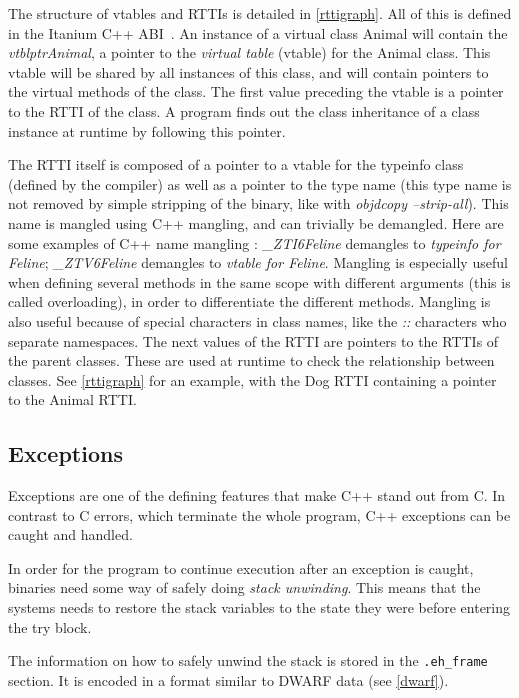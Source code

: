 \documentclass[a4paper,11pt,oneside]{report}
\begin{document}
The structure of vtables and RTTIs is detailed in \autoref{rttigraph}.
All of this is defined in the Itanium C++ ABI~\cite{cppabi}.
An instance of a virtual class Animal will contain the \emph{vtblptrAnimal}, 
a pointer to the \emph{virtual table} (vtable) for the Animal class.
This vtable will be shared by all instances of this class, and will contain
pointers to the virtual methods of the class.
The first value preceding the vtable is a pointer to the RTTI of the class. A
program finds out the class inheritance of a class instance at runtime by
following this pointer.

The RTTI itself is composed of a pointer to a vtable for the typeinfo class
(defined by the compiler) as well as a pointer to the type name (this type 
name is not removed by simple stripping of the binary, like with 
\emph{objdcopy --strip-all}).
This name is mangled using C++ mangling, and can trivially be demangled.
Here are some examples of C++ name mangling :
\emph{\_ZTI6Feline} demangles to \emph{typeinfo for Feline};
\emph{\_ZTV6Feline} demangles to \emph{vtable for Feline}.
Mangling is especially useful when defining several methods in the same scope 
with different arguments (this is called overloading), in order to
differentiate the different methods.
Mangling is also useful because of special characters in class names, like the
\emph{::} characters who separate namespaces.
The next values of the RTTI are pointers to the RTTIs of the parent classes.
These are used at runtime to check the relationship between classes.
See \autoref{rttigraph} for an example, with the Dog RTTI containing a pointer 
to the Animal RTTI.

\subsection{Exceptions}
\label{exceptions}

Exceptions are one of the defining features that make C++ stand out from C.
In contrast to C errors, which terminate the whole program, C++ exceptions
can be caught and handled.

In order for the program to continue execution after an exception is caught,
binaries need some way of safely doing \emph{stack unwinding}.
This means that the systems needs to restore the stack variables to the state
they were before entering the try block.

The information on how to safely unwind the stack is stored in the
\texttt{.eh\_frame} section. It is encoded in a format similar to DWARF data
(see \autoref{dwarf}).
\end{document}
